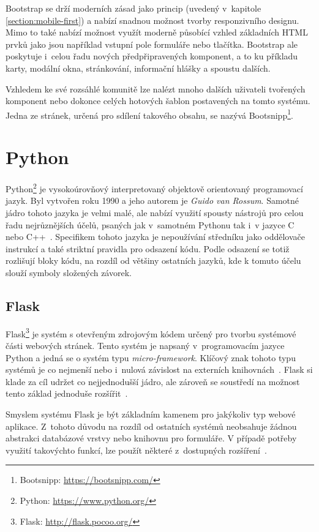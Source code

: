 Bootstrap se drží moderních zásad jako princip  (uvedený v~kapitole \ref{section:mobile-first}) a nabízí snadnou možnost tvorby responzivního designu. Mimo to také nabízí možnost využít moderně působící vzhled základních HTML prvků jako jsou například vstupní pole formuláře nebo tlačítka. Bootstrap ale poskytuje i~celou řadu nových předpřipravených komponent, a to ku příkladu karty, modální okna, stránkování, informační hlášky a spoustu dalších.

Vzhledem ke své rozsáhlé komunitě lze nalézt mnoho dalších uživateli tvořených komponent nebo dokonce celých hotových šablon postavených na tomto systému. Jedna ze stránek, určená pro sdílení takového obsahu, se nazývá Bootsnipp\footnote{Bootsnipp: \url{https://bootsnipp.com/}}.



\section{Python}
Python\footnote{Python: \url{https://www.python.org/}} je vysokoúrovňový interpretovaný objektově orientovaný programovací jazyk. Byl vytvořen roku 1990 a jeho autorem je \emph{Guido van Rossum}. Samotné jádro tohoto jazyka je velmi malé, ale nabízí využití spousty nástrojů pro celou řadu nejrůznějších účelů, psaných jak v~samotném Pythonu tak i~v jazyce C nebo C++~\cite{bib:python}. Specifikem tohoto jazyka je nepoužívání středníku jako oddělovače instrukcí a také striktní pravidla pro odsazení kódu. Podle odsazení se totiž rozlišují bloky kódu, na rozdíl od většiny ostatních jazyků, kde k tomuto účelu slouží symboly složených závorek. 


\subsection{Flask}
Flask\footnote{Flask: \url{http://flask.pocoo.org/}} je systém s otevřeným zdrojovým kódem určený pro tvorbu systémové části webových stránek. Tento systém je napsaný v~programovacím jazyce Python a jedná se o systém typu \emph{micro-framework}. Klíčový znak tohoto typu systémů je co nejmenší nebo i~nulová závislost na externích knihovnách~\cite{bib:flask-doc}.
Flask si klade za cíl udržet co nejjednodušší jádro, ale zároveň se soustředí na možnost tento základ jednoduše rozšířit~\cite{bib:flask-pym}.

Smyslem systému Flask je být základním kamenem pro jakýkoliv typ webové aplikace. Z~tohoto důvodu na rozdíl od ostatních systémů neobsahuje žádnou abstrakci databázové vrstvy nebo knihovnu pro formuláře. V případě potřeby využití takovýchto funkcí, lze použít některé z~dostupných rozšíření~\cite{bib:flask-design}.

